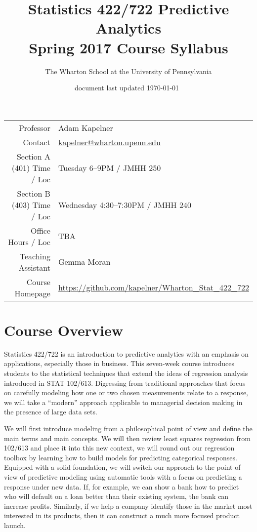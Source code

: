 \documentclass[12pt]{article}
\title{Statistics 422/722 Predictive Analytics \\ Spring 2017 Course Syllabus}
\author{The Wharton School at the University of Pennsylvania}
\date{\small document last updated \today ~\currenttime }
\begin{document}
\maketitle

\begin{table}[htp]
\centering
\begin{tabular}{rl}
Professor &  Adam Kapelner \\
Contact & \url{kapelner@wharton.upenn.edu} \\
Section A (401) Time / Loc & Tuesday 6--9PM / JMHH 250 \\
Section B (403) Time / Loc & Wednesday 4:30--7:30PM / JMHH 240 \\
Office Hours / Loc & TBA \\
Teaching Assistant & Gemma Moran \\
Course Homepage & \href{https://github.com/kapelner/Wharton_Stat_422_722}{https://github.com/kapelner/Wharton\_Stat\_422\_722} \\
\end{tabular}
\end{table}

\section*{Course Overview} 

Statistics 422/722 is an introduction to predictive analytics with an emphasis on applications, especially those in business. This seven-week course introduces students to the statistical techniques that extend the ideas of regression analysis introduced in STAT 102/613. Digressing from traditional approaches that focus on carefully modeling how one or two chosen measurements relate to a response, we will take a ``modern'' approach applicable to managerial decision making in the presence of large data sets.  

We will first introduce modeling from a philosophical point of view and define the main terms and main concepts. We will then review least squares regression from 102/613 and place it into this new context, we will round out our regression toolbox by learning how to build models for predicting categorical responses. Equipped with a solid foundation, we will switch our approach to the point of view of predictive modeling using automatic tools with a focus on predicting a response under new data. If, for example, we can show a bank how to predict who will default on a loan better than their existing system, the bank can increase profits. Similarly, if we help a company identify those in the market most interested in its products, then it can construct a much more focused product launch.
\end{document}
